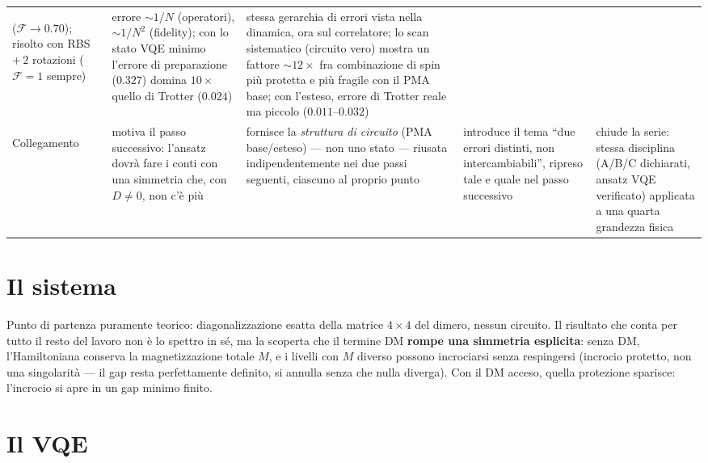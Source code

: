 \documentclass[11pt,a4paper]{article}
\begin{document}
\begin{landscape}
\begin{center}
\begin{tabular}{@{}>{\bfseries\raggedright}p{2.7cm} p{5.15cm} p{5.15cm} p{5.15cm} p{5.15cm}@{}}
($\mathcal F\to0.70$); risolto con RBS $+\,2$ rotazioni ($\mathcal F=1$
sempre) &
errore $\sim1/N$ (operatori), $\sim1/N^2$ (fidelity); con lo stato VQE
minimo l'errore di preparazione ($0.327$) domina $10\times$ quello di
Trotter ($0.024$) &
stessa gerarchia di errori vista nella dinamica, ora sul correlatore; lo
scan sistematico (circuito vero) mostra un fattore $\sim12\times$ fra
combinazione di spin più protetta e più fragile con il PMA base; con
l'esteso, errore di Trotter reale ma piccolo ($0.011$--$0.032$) \\
\addlinespace
Collegamento &
motiva il passo successivo: l'ansatz dovrà fare i conti con una
simmetria che, con $D\neq0$, non c'è più &
fornisce la \emph{struttura di circuito} (PMA base/esteso) --- non uno
stato --- riusata indipendentemente nei due passi seguenti, ciascuno al
proprio punto &
introduce il tema ``due errori distinti, non intercambiabili'', ripreso
tale e quale nel passo successivo &
chiude la serie: stessa disciplina (A/B/C dichiarati, ansatz VQE
verificato) applicata a una quarta grandezza fisica \\
\bottomrule
\end{tabular}
\end{center}
\end{landscape}

\clearpage

\section{Il sistema}

Punto di partenza puramente teorico: diagonalizzazione esatta della
matrice $4\times4$ del dimero, nessun circuito. Il risultato che conta per
tutto il resto del lavoro non è lo spettro in sé, ma la scoperta che il
termine DM \textbf{rompe una simmetria esplicita}: senza DM,
l'Hamiltoniana conserva la magnetizzazione totale $M$, e i livelli con $M$
diverso possono incrociarsi senza respingersi (incrocio protetto, non una
singolarità --- il gap resta perfettamente definito, si annulla senza che
nulla diverga). Con il DM acceso, quella protezione sparisce: l'incrocio
si apre in un gap minimo finito.


\section{Il VQE}
\end{document}

